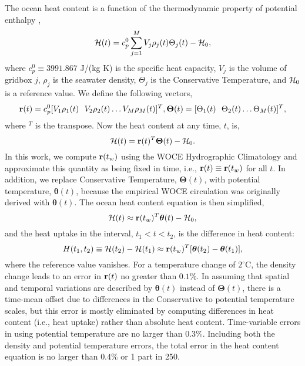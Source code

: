 \documentclass[12pt]{article}
\begin{document}
The ocean heat content is a function of the thermodynamic property of potential enthalpy \cite{McDougall--2003:Potential,IOC--2010:IAPSO:},
\begin{equation}
{\cal H}(t) =  c_p^0 \sum^M_{j=1} V_j \rho_j(t) \Theta_j(t) - {\cal H}_0,
\end{equation}
where $c_p^0\equiv 3991.867$ J/(kg K) is the specific heat capacity, $V_j$ is the volume of gridbox $j$, $\rho_j$ is the seawater density, $\Theta_j$ is the Conservative Temperature, and ${\cal H}_0$ is a reference value. We define the following vectors,
\begin{equation}
{\bf r}(t) =  c_p^0 [V_1 \rho_1(t)   ~~V_2 \rho_2(t)  \ldots V_M \rho_M(t)]^T,
{\boldsymbol \Theta}(t) =  [\Theta_1(t)   ~~\Theta_2(t)  \ldots \Theta_M(t)]^T,
\end{equation}
where $^T$ is the transpose. Now the heat content at any time, $t$, 
is,
\begin{equation}
{\cal H}(t) =  {\bf r}(t)^T {\boldsymbol \Theta}(t) - {\cal H}_0.
\end{equation}
In this work, we compute ${\bf r}(t_w)$ using the WOCE Hydrographic
Climatology \cite{Gouretski-Koltermann-2004:WOCE} and approximate this
quantity as being fixed in time, i.e.,
${\bf r}(t) \equiv {\bf r}(t_w)$ for all $t$. In addition, we replace
Conservative Temperature, ${\boldsymbol \Theta}(t)$, with potential
temperature, ${\boldsymbol \theta}(t)$, because the empirical WOCE circulation \cite{Gebbie-Huybers-2012:mean} was
originally derived with ${\boldsymbol \theta}(t)$.  The ocean heat
content equation is then simplified,
\begin{equation}
{\cal H}(t) \approx  {\bf r}(t_w)^T {\boldsymbol \theta}(t) - {\cal H}_0,
\end{equation}
and the heat uptake in the interval, $t_1 < t < t_2$, is the difference in heat content:
\begin{equation}
H(t_1,t_2) \equiv {\cal H}(t_2) - {\cal H}(t_1) \approx  {\bf r}(t_w)^T[  {\boldsymbol \theta}(t_2)  -{\boldsymbol \theta}(t_1)], 
\end{equation}
where the reference value vanishes. For a temperature change of
$2^{\circ}$C, the density change leads to an error in ${\bf r}(t)$ no
greater than $0.1\%$. In assuming that spatial and temporal variations
are described by ${\boldsymbol \theta}(t)$ instead of
${\boldsymbol \Theta}(t)$, there is a time-mean offset due to
differences in the Conservative to potential temperature scales, but
this error is mostly eliminated by computing differences in heat
content (i.e., heat uptake) rather than absolute heat content.
Time-variable errors in using potential temperature are no larger than
$0.3\%$. Including both the density and potential temperature errors,
the total error in the heat content equation is no larger than $0.4\%$
or 1 part in 250. 
\end{document}
